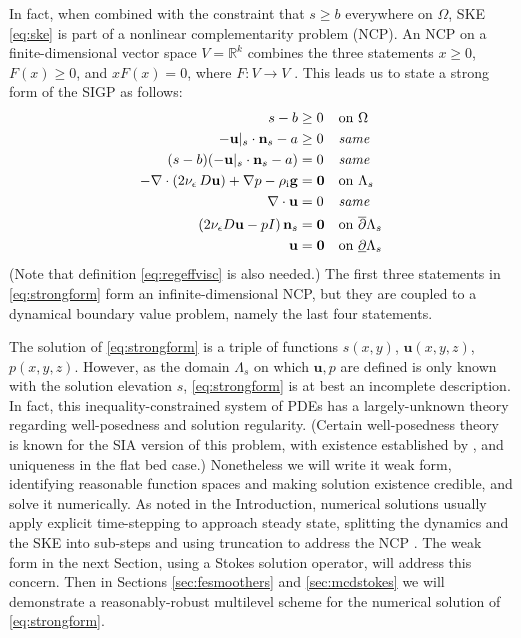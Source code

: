 \documentclass[letterpaper,final,12pt,reqno]{amsart}
\theoremstyle{claim}
\newcommand{\eps}{\epsilon}
\newcommand{\RR}{\mathbb{R}}
\newcommand{\bn}{\mathbf{n}}
\newcommand{\bu}{\mathbf{u}}
\newcommand{\bzero}{\bm{0}}
\newcommand{\rhoi}{\rho_{\text{i}}}
\numberwithin{equation}{section}
\numberwithin{figure}{section}
\numberwithin{table}{section}
\numberwithin{theorem}{section}
\begin{document}
In fact, when combined with the constraint that $s\ge b$ everywhere on $\Omega$, SKE \eqref{eq:ske} is part of a nonlinear complementarity problem (NCP).  An NCP on a finite-dimensional vector space $V=\RR^k$ combines the three statements $x\ge 0$, $F(x)\ge 0$, and $x F(x)=0$, where $F:V\to V$ \cite{FacchineiPang2003}.  This leads us to state a strong form of the SIGP as follows:
\begin{align}
s - b &\ge 0 && \text{on $\Omega$} \label{eq:strongform} \\
- \bu|_s \cdot \bn_s - a &\ge 0 && \text{\emph{same}} \notag \\
(s - b) (- \bu|_s \cdot \bn_s - a) &= 0 && \text{\emph{same}} \notag \\
- \nabla \cdot \left(2 \nu_\eps\, D\bu\right) + \nabla p - \rhoi \mathbf{g} &= \bzero && \text{on $\Lambda_s$} \notag \\
\nabla \cdot \bu &= 0 && \text{\emph{same}} \notag \\
\left(2 \nu_\eps D\bu - pI\right) \bn_s &= \bzero && \text{on $\overline{\partial} \Lambda_s$} \notag \\
\bu &= \bzero && \text{on $\underline{\partial} \Lambda_s$} \notag
\end{align}
(Note that definition \eqref{eq:regeffvisc} is also needed.)  The first three statements in \eqref{eq:strongform} form an infinite-dimensional NCP, but they are coupled to a dynamical boundary value problem, namely the last four statements.

The solution of \eqref{eq:strongform} is a triple of functions $s(x,y)$, $\bu(x,y,z)$, $p(x,y,z)$.  However, as the domain $\Lambda_s$ on which $\bu,p$ are defined is only known with the solution elevation $s$, \eqref{eq:strongform} is at best an incomplete description.  In fact, this inequality-constrained system of PDEs has a largely-unknown theory regarding well-posedness and solution regularity.  (Certain well-posedness theory is known for the SIA version of this problem, with existence established by \cite{JouvetBueler2012}, and uniqueness in the flat bed case.)  Nonetheless we will write it weak form, identifying reasonable function spaces and making solution existence credible, and solve it numerically.  As noted in the Introduction, numerical solutions usually apply explicit time-stepping to approach steady state, splitting the dynamics and the SKE into sub-steps and using truncation to address the NCP \cite[for example]{Jouvetetal2008,Lengetal2012}.  The weak form in the next Section, using a Stokes solution operator, will address this concern.  Then in Sections \ref{sec:fesmoothers} and \ref{sec:mcdstokes} we will demonstrate a reasonably-robust multilevel scheme for the numerical solution of \eqref{eq:strongform}.
\end{document}
